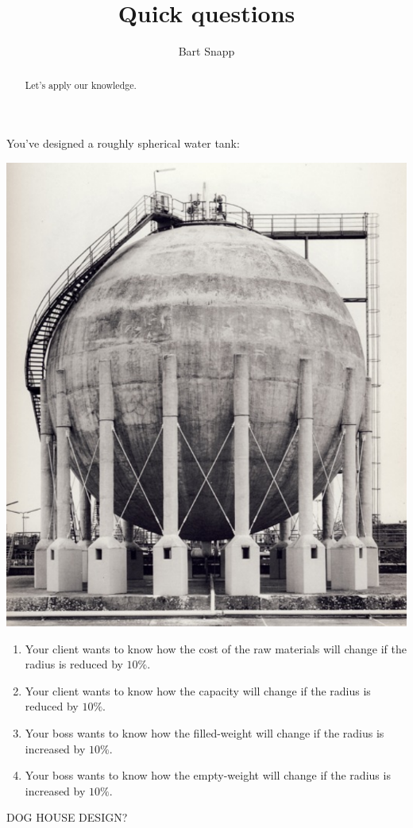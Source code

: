\documentclass[handout,nooutcomes,noauthor]{ximera}
\title{Quick questions}
\author{Bart Snapp}
\begin{document}
\begin{abstract}
  Let's apply our knowledge.
\end{abstract}
\maketitle


\begin{listOutcomes}
\item 
\end{listOutcomes}


\mynewpage


\begin{question} 
  You've designed a roughly spherical water tank:
\begin{center}%
  \includegraphics[width=.4\textwidth]{tank.png}  
\end{center}
\begin{enumerate}
\item Your client wants to know how the cost of the raw materials will
  change if the radius is reduced by $10\%$.
\item Your client wants to know how the capacity will change if the
  radius is reduced by $10\%$.
\item Your boss wants to know how the filled-weight will change if the
  radius is increased by $10\%$.
\item Your boss wants to know how the empty-weight will change if the
  radius is increased by $10\%$.
\end{enumerate}
\end{question}

\mynewpage




\begin{question}
  DOG HOUSE DESIGN?
\end{question}

\mynewpage


\begin{question}
\end{question}
\end{document}

